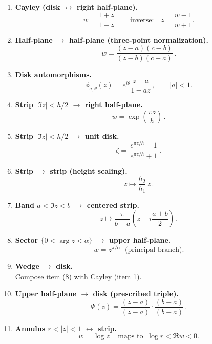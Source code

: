 \documentclass[11pt]{article}
\begin{document}
\begin{enumerate}
	\item \textbf{Cayley (disk $\leftrightarrow$ right half-plane).}\\[2pt]
	\[
	\boxed{\,w=\frac{1+z}{1-z}\,}\qquad\text{inverse:}\quad z=\frac{w-1}{w+1}.
	\]
	
	\item \textbf{Half-plane $\to$ half-plane (three-point normalization).}\\[2pt]
	\[
	\boxed{\,w=\frac{(z-a)(c-b)}{(z-b)(c-a)}\,}.
	\]
	
	\item \textbf{Disk automorphisms.}\\[2pt]
	\[
	\boxed{\,\phi_{a,\theta}(z)=e^{i\theta}\frac{z-a}{1-\bar a z}\,},\qquad |a|<1.
	\]
	
	\item \textbf{Strip $|\Im z|<h/2$ $\to$ right half-plane.}\\[2pt]
	\[
	\boxed{\,w=\exp\!\left(\frac{\pi z}{h}\right)\,}.
	\]
	
	\item \textbf{Strip $|\Im z|<h/2$ $\to$ unit disk.}\\[2pt]
	\[
	\boxed{\,\zeta=\frac{e^{\pi z/h}-1}{\,e^{\pi z/h}+1\,}\,}.
	\]
	
	\item \textbf{Strip $\to$ strip (height scaling).}\\[2pt]
	\[
	\boxed{\,z\mapsto \frac{h_2}{h_1}\,z\,}.
	\]
	
	\item \textbf{Band $a<\Im z<b$ $\to$ centered strip.}\\[2pt]
	\[
	\boxed{\,z\mapsto \frac{\pi}{b-a}\!\left(z-i\frac{a+b}{2}\right)\,}.
	\]
	
	\item \textbf{Sector $\{0<\arg z<\alpha\}$ $\to$ upper half-plane.}\\[2pt]
	\[
	\boxed{\,w=z^{\pi/\alpha}\,}\ \ \text{(principal branch)}.
	\]
	
	\item \textbf{Wedge $\to$ disk.}\\[2pt]
	Compose item (8) with Cayley (item 1).
	
	\item \textbf{Upper half-plane $\to$ disk (prescribed triple).}\\[2pt]
	\[
	\boxed{\,\Phi(z)=\frac{(z-a)}{(z-\bar a)}\cdot \frac{(b-\bar a)}{(b-a)}\,}.
	\]
	
	\item \textbf{Annulus $r<|z|<1$ $\leftrightarrow$ strip.}\\[2pt]
	\[
	\boxed{\,w=\log z\,}\quad\text{maps to }\ \log r<\Re w<0.
	\]
	

\end{enumerate}
\end{document}
